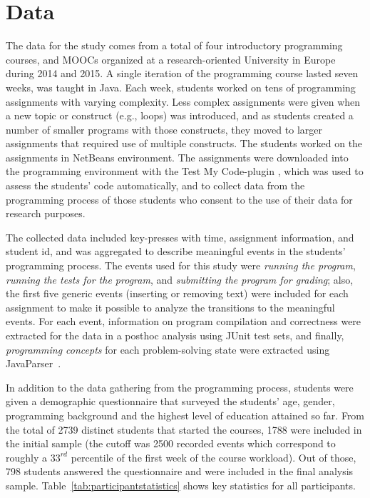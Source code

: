 \documentclass{sigchi}
\begin{document}
\section{Data}

The data for the study comes from a total of four introductory programming courses, and MOOCs organized at a research-oriented University in Europe during 2014 and 2015. A single iteration of the programming course lasted seven weeks, was taught in Java. %
Each week, students worked on tens of programming assignments with varying complexity. Less complex assignments were given when a new topic or construct (e.g., loops) was introduced, and as students created a number of smaller programs with those constructs, they moved to larger assignments that required use of multiple constructs. The students worked on the assignments in NetBeans environment. %
The assignments were downloaded into the programming environment with the Test My Code-plugin \cite{testMyCode}, which was used to assess the students' code automatically, and to collect data from the programming process of those students who consent to the use of their data for research purposes. 

The collected data included key-presses with time, assignment information, and student id, and was aggregated to describe meaningful events in the students' programming process. The events used for this study were \emph{running the program}, \emph{running the tests for the program}, and \emph{submitting the program for grading}; also, the first five generic events (inserting or removing text) were included for each assignment to make it possible to analyze the transitions to the meaningful events. For each event, information on program compilation and correctness were extracted for the data in a posthoc analysis using JUnit test sets, and finally, \emph{programming concepts} for each problem-solving state were extracted using JavaParser~\cite{hosseini2013javaparser}.

In addition to the data gathering from the programming process, students were given a demographic questionnaire that surveyed the students' age, gender, programming background and the highest level of education attained so far. From the total of 2739 distinct students that started the courses, 1788 were included in the initial sample (the cutoff was 2500 recorded events which correspond to roughly a $33^{rd}$ percentile of the first week of the course workload). Out of those, 798 students answered the questionnaire and were included in the final analysis sample. Table~\ref{tab:participantstatistics} shows key statistics for all participants.%
\end{document}
